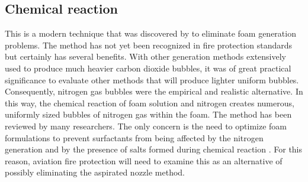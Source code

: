 \documentclass[12pt]{report}
\begin{document}
\subsection{Chemical reaction}
This is a modern technique that was discovered by \cite{laundess2012suppression} to eliminate foam generation problems. The method has not yet been recognized in fire protection standards but certainly has several benefits. With other generation methods extensively used to produce much heavier carbon dioxide bubbles, it was of great practical significance to evaluate other methods that will produce lighter uniform bubbles. Consequently, nitrogen gas bubbles were the empirical and realistic alternative. In this way, the chemical reaction of foam solution and nitrogen creates numerous, uniformly sized bubbles of nitrogen gas within the foam.
The method has been reviewed by many researchers.  The only concern is the need to optimize foam formulations to prevent surfactants from being affected by the nitrogen generation and by the presence of salts formed during chemical reaction \cite{laundess2012suppression}.  For this reason, aviation fire protection will need to examine this as an alternative of possibly eliminating the aspirated nozzle method.
\end{document}
